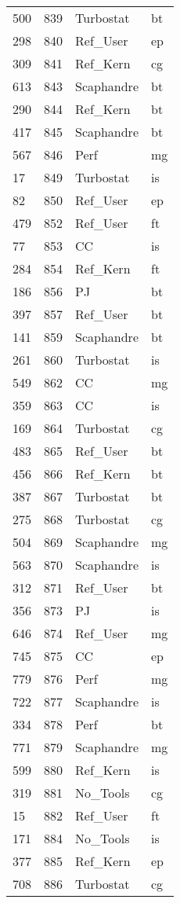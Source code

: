 \begin{tabular}{lrll}
500 & 839 & Turbostat & bt \\
298 & 840 & Ref_User & ep \\
309 & 841 & Ref_Kern & cg \\
613 & 843 & Scaphandre & bt \\
290 & 844 & Ref_Kern & bt \\
417 & 845 & Scaphandre & bt \\
567 & 846 & Perf & mg \\
17 & 849 & Turbostat & is \\
82 & 850 & Ref_User & ep \\
479 & 852 & Ref_User & ft \\
77 & 853 & CC & is \\
284 & 854 & Ref_Kern & ft \\
186 & 856 & PJ & bt \\
397 & 857 & Ref_User & bt \\
141 & 859 & Scaphandre & bt \\
261 & 860 & Turbostat & is \\
549 & 862 & CC & mg \\
359 & 863 & CC & is \\
169 & 864 & Turbostat & cg \\
483 & 865 & Ref_User & bt \\
456 & 866 & Ref_Kern & bt \\
387 & 867 & Turbostat & bt \\
275 & 868 & Turbostat & cg \\
504 & 869 & Scaphandre & mg \\
563 & 870 & Scaphandre & is \\
312 & 871 & Ref_User & bt \\
356 & 873 & PJ & is \\
646 & 874 & Ref_User & mg \\
745 & 875 & CC & ep \\
779 & 876 & Perf & mg \\
722 & 877 & Scaphandre & is \\
334 & 878 & Perf & bt \\
771 & 879 & Scaphandre & mg \\
599 & 880 & Ref_Kern & is \\
319 & 881 & No_Tools & cg \\
15 & 882 & Ref_User & ft \\
171 & 884 & No_Tools & is \\
377 & 885 & Ref_Kern & ep \\
708 & 886 & Turbostat & cg \\

\end{tabular}
